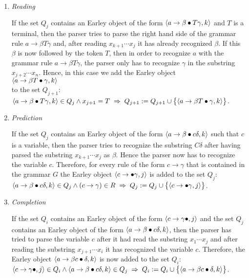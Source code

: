 \begin{enumerate}
\item \emph{Reading}

      If the set $Q_j$ contains an Earley object of the form 
      $\pair(a \rightarrow \beta \bullet T \gamma, k)$ and $T$ is a 
      terminal, then the parser tries to parse the right hand side of the grammar rule
      $a \rightarrow \beta T \gamma$ and, after reading $x_{k+1} \cdots x_j$ it has already recognized $\beta$.
      If this $\beta$ is now followed by the token $T$, then in order to recognize $a$ with the grammar rule
      $a \rightarrow \beta T \gamma$, the parser only has to recognize $\gamma$ in the substring
      $x_{j+2} \cdots x_n$.  Hence, in this case we add the Earley object
      \\[0.2cm]
      \hspace*{1.3cm}
      $\pair(a \rightarrow \beta T \bullet \gamma, k)$
      \\[0.2cm]
      to the set $Q_{j+1}$:
      \\[0.2cm]
      \hspace*{1.3cm}
      $\pair(a \rightarrow \beta \bullet T \gamma, k) \in Q_j \wedge x_{j+1} = T
       \;\Rightarrow\;
       Q_{j+1} := Q_{j+1} \cup \bigl\{ \pair(a \rightarrow \beta T \bullet \gamma, k) \bigr\}$.
\item \emph{Prediction}

      If the set $Q_j$ contains an Earley object of the form $\pair(a \rightarrow \beta \bullet c \delta, k)$
      such that $c$ is a variable, then the parser tries to recognize the substring $C\delta$ after having
      parsed the substring $x_{k+1} \cdots x_j$ as $\beta$.  Hence the parser now has to recognize the variable
      $c$.  Therefore, for every rule of the form $c \rightarrow \gamma$ that is contained in the grammar $G$
      the Earley object 
      $\pair(c \rightarrow \bullet \gamma, j)$ is added to the set $Q_j$:
      \\[0.2cm]
      \hspace*{1.3cm}
      $\pair(a \rightarrow \beta \bullet c \delta, k) \in Q_j 
       \wedge (c \rightarrow \gamma) \in R 
       \;\Rightarrow\;
       Q_j := Q_j \cup\bigl\{ \pair(c \rightarrow \bullet\gamma, j)\bigr\}$.
\item \emph{Completion}

      If the set $Q_i$ contains an Earley object of the form $\pair(c \rightarrow \gamma \bullet, j)$
      and the set $Q_j$ contains an Earley object of the form 
      $\pair(a \rightarrow \beta \bullet c \delta,k)$, then the parser has tried to parse the variable $c$
      after it had read the substring $x_1\cdots x_{j}$ and after reading the substring $x_{j+1}\cdots x_i$
      it has recognized the variable $c$.
      Therefore, the Earley object
      $\pair(a \rightarrow \beta c \bullet \delta,k)$
      is now added to the set $Q_i$:
      \\[0.2cm]
      \hspace*{1.3cm}
      $\pair(c \rightarrow \gamma \bullet, j) \in Q_i \wedge
       \pair(a \rightarrow \beta \bullet c \delta,k) \in Q_j \;\Rightarrow\;
       Q_i := Q_i \cup \bigl\{ \pair(a \rightarrow \beta c \bullet \delta,k) \bigr\}
      $.
\end{enumerate}
